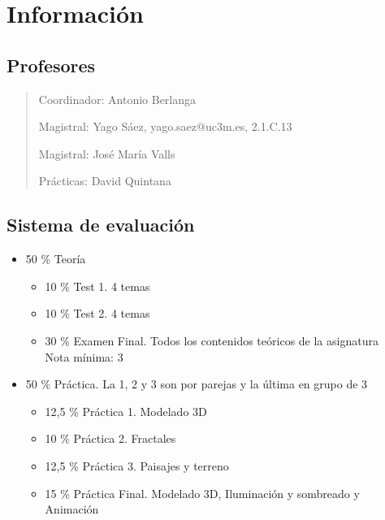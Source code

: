 \documentclass[12pt, twoside, openright]{report} %
\begin{document}
\tableofcontents
\thispagestyle{fancy}

\listoffigures
\thispagestyle{fancy}

\listoftables
\thispagestyle{fancy}




\chapter{Información}\label{ch:informacion}
\section{Profesores}\label{sec:profesores}
\begin{quote}
    Coordinador: Antonio Berlanga

	Magistral: Yago Sáez, yago.saez@uc3m.es, 2.1.C.13

    Magistral: José María Valls

    Prácticas: David Quintana
\end{quote}

\section{Sistema de evaluación}\label{sec:sistema-de-evaluación}
\begin{itemize}
  \item 50 \% Teoría
  \begin{itemize}
    \item 10 \% Test 1. 4 temas
    \item 10 \% Test 2. 4 temas
    \item 30 \% Examen Final. Todos los contenidos teóricos de la asignatura \\ Nota mínima: 3
  \end{itemize}
  \item 50 \% Práctica. La 1, 2 y 3 son por parejas y la última en grupo de 3
  \begin{itemize}
    \item 12,5 \% Práctica 1. Modelado 3D
    \item 10 \% Práctica 2. Fractales
    \item 12,5 \% Práctica 3. Paisajes y terreno
    \item 15 \% Práctica Final. Modelado 3D, Iluminación y sombreado y Animación
  \end{itemize}
\end{itemize}
\end{document}
